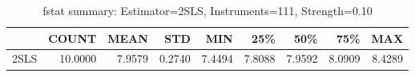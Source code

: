 \begin{table}[ht]
\centering
\caption{fstat summary: Estimator=2SLS, Instruments=111, Strength=0.10}
\begin{tabular}{lrrrrrrrr}
\toprule
 & COUNT & MEAN & STD & MIN & 25\% & 50\% & 75\% & MAX \\
\midrule
2SLS & 10.0000 & 7.9579 & 0.2740 & 7.4494 & 7.8088 & 7.9592 & 8.0909 & 8.4289 \\
\bottomrule
\end{tabular}
\end{table}
